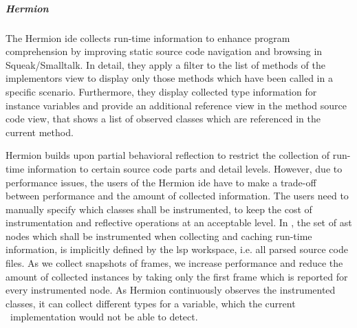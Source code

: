     \subparagraph{Hermion}
    The Hermion \ac{ide} \cite{rothlisberger2008exploiting} collects run-time information to enhance program comprehension by improving static source code navigation and browsing in Squeak/Smalltalk. In detail, they apply a filter to the list of methods of the implementors view to display only those methods which have been called in a specific scenario. Furthermore, they display collected type information for instance variables and provide an additional reference view in the method source code view, that shows a list of observed classes which are referenced in the current method.
    
    Hermion builds upon partial behavioral reflection \cite{tanter2003partial} to restrict the collection of run-time information to certain source code parts and detail levels. However, due to performance issues, the users of the Hermion \ac{ide} have to make a trade-off between performance and the amount of collected information. The users need to manually specify which classes shall be instrumented, to keep the cost of instrumentation and reflective operations at an acceptable level. In \graallsp, the set of \ac{ast} nodes which shall be instrumented when collecting and caching run-time information, is implicitly defined by the \ac{lsp} workspace, i.e. all parsed source code files. As we collect snapshots of frames, we increase performance and reduce the amount of collected instances by taking only the first frame which is reported for every instrumented node. As Hermion continuously observes the instrumented classes, it can collect different types for a variable, which the current \graallsp~implementation would not be able to detect.
    
